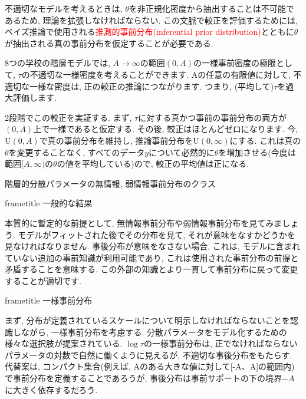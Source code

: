 \documentclass[10pt,dvipdfmx,a4]{beamer}
\newcommand{\dbox}[1]{\begin{beamercolorbox}[wd=122mm, sep=0pt, shadow=false, rounded=false]{frametitle} { #1}\end{beamercolorbox}}
\newcommand{\tcr}[1]{\textcolor{red}{#1}}
\begin{document}
\begin{frame}
不適切なモデルを考えるときは, $\theta$を非正規化密度から抽出することは不可能であるため, 理論を拡張しなければならない.
この文脈で較正を評価するためには, ベイズ推論で使用される\tcr{推測的事前分布(inferential prior distribution)}とともに$\theta$が抽出される真の事前分布を仮定することが必要である.

8つの学校の階層モデルでは, $A\rightarrow\infty$の範囲$(0, A)$の一様事前密度の極限として, $\tau$の不適切な一様密度を考えることができます.
Aの任意の有限値に対して, 不適切な一様な密度は, 正の較正の推論につながります.
つまり, (平均して)$\tau$を過大評価します.

2段階でこの較正を実証する.
まず, $\tau$に対する真かつ事前の事前分布の両方が$(0, A)$上で一様であると仮定する.
その後, 較正はほとんどゼロになります.
今, $\text{U}(0, A)$で真の事前分布を維持し, 推論事前分布を$\text{U}(0, \infty)$にする.
これは真の$\theta$を変更することなく, すべてのデータ$y$について必然的に$\theta$を増加させる(今度は範囲$[A, \infty)$の$\theta$の値を平均している)ので, 較正の平均値は正になる.
\end{frame}


\begin{frame}{階層的分散パラメータの無情報, 弱情報事前分布のクラス}
\dbox{一般的な結果}
本質的に暫定的な前提として, 無情報事前分布や弱情報事前分布を見てみましょう.
モデルがフィットされた後でその分布を見て, それが意味をなすかどうかを見なければなりません.
事後分布が意味をなさない場合, これは, モデルに含まれていない追加の事前知識が利用可能であり, これは使用された事前分布の前提と矛盾することを意味する.
この外部の知識とより一貫して事前分布に戻って変更することが適切です.

\dbox{一様事前分布}
まず, 分布が定義されているスケールについて明示しなければならないことを認識しながら, 一様事前分布を考慮する.
分散パラメータをモデル化するための様々な選択肢が提案されている.
$\log\tau$の一様事前分布は, 正でなければならないパラメータの対数で自然に働くように見えるが, 不適切な事後分布をもたらす.
代替案は, コンパクト集合(例えば, Aのある大きな値に対して[-A、A]の範囲内)で事前分布を定義することであろうが, 事後分布は事前サポートの下の境界$-A$に大きく依存するだろう.
\end{frame}

\end{document}
